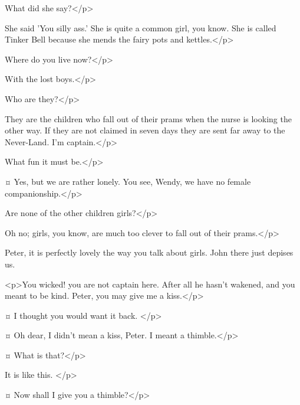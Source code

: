 
\wendyspeaks
What did she say?</p>

\peterspeaks
She said 'You silly ass.'
She is quite a common girl, you know.
She is called Tinker Bell because she mends the fairy pots and kettles.</p>


\wendyspeaks
Where do you live now?</p>

\peterspeaks
With the lost boys.</p>

\wendyspeaks
Who are they?</p>

\peterspeaks
They are the children who fall out of their prams when the nurse is looking the other way.
If they are not claimed in seven days they are sent far away to the Never-Land.
I'm captain.</p>

\wendyspeaks
What fun it must be.</p>

\peterspeaks {}¤
Yes, but we are rather lonely.
You see, Wendy, we have no female companionship.</p>

\wendyspeaks
Are none of the other children girls?</p>

\peterspeaks
Oh no; girls, you know, are much too clever to fall out of their prams.</p>

\wendyspeaks
Peter, it is perfectly lovely the way you talk about girls.
John there just depises us.


<p>You wicked!
you are not captain here.
After all he hasn't wakened, and you meant to be kind.
Peter, you may give me a kiss.</p>

\peterspeaks {}¤
I thought you would want it back.
</p>

\wendyspeaks {}¤
Oh dear, I didn't mean a kiss, Peter.
I meant a thimble.</p>

\peterspeaks {}¤
What is that?</p>

\wendyspeaks
It is like this.
</p>

\peterspeaks {}¤
Now shall I give you a thimble?</p>

